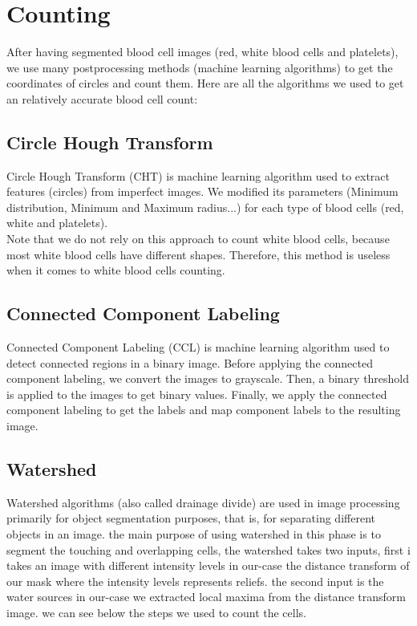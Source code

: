 \section{Counting}
\vspace{0.2in}
\hspace{\parindent}
After having segmented blood cell images (red, white blood cells and platelets), we use many postprocessing methods (machine learning algorithms) to get the coordinates of circles and count them.
Here are all the algorithms we used to get an relatively accurate blood cell count:

\subsection{Circle Hough Transform}
\hspace{\parindent}
Circle Hough Transform (CHT) is machine learning algorithm used to extract features (circles) from imperfect images.
We modified its parameters (Minimum distribution, Minimum and Maximum radius...) for each type of blood cells (red, white and platelets).\\
Note that we do not rely on this approach to count white blood cells, because most white blood cells have different shapes.
Therefore, this method is useless when it comes to white blood cells counting.

\subsection{Connected Component Labeling}
\hspace{\parindent}
Connected Component Labeling (CCL) is machine learning algorithm used to detect connected regions in a binary image.
Before applying the connected component labeling, we convert the images to grayscale. Then, a binary threshold is applied to the images to get binary values.
Finally, we apply the connected component labeling to get the labels and map component labels to the resulting image.

\subsection{Watershed}
\hspace{\parindent}
Watershed algorithms (also called drainage divide) are used in image processing primarily for object segmentation purposes, that is, for separating different objects in an image. the main purpose of using watershed in this phase is to segment the touching and overlapping cells, the watershed takes two inputs, first i takes an image with different intensity levels in our-case the distance transform of our mask where the intensity levels represents reliefs. the second input is the water sources in our-case we extracted local maxima from the distance transform image. we can see below the steps we used to count the cells.

